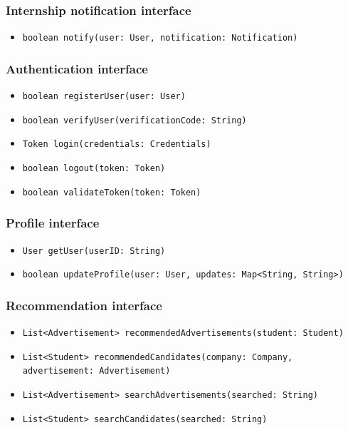 \subsubsection{Internship notification interface}
\begin{itemize}
    \item \verb|boolean notify(user: User, notification: Notification)|
\end{itemize}

\subsubsection{Authentication interface}
\begin{itemize}
    \item \verb|boolean registerUser(user: User)|
    \item \verb|boolean verifyUser(verificationCode: String)|
    \item \verb|Token login(credentials: Credentials)|
    \item \verb|boolean logout(token: Token)|
    \item \verb|boolean validateToken(token: Token)|
\end{itemize}

\subsubsection{Profile interface}
\begin{itemize}
    \item \verb|User getUser(userID: String)|
    \item \verb|boolean updateProfile(user: User, updates: Map<String, String>)|
\end{itemize}

\subsubsection{Recommendation interface}
\begin{itemize}
    \item \verb|List<Advertisement> recommendedAdvertisements(student: Student)|
    \item \verb|List<Student> recommendedCandidates(company: Company, | \\ \makebox[10em][l]{} \verb|advertisement: Advertisement)|
    \item \verb|List<Advertisement> searchAdvertisements(searched: String)|
    \item \verb|List<Student> searchCandidates(searched: String)|
\end{itemize}

